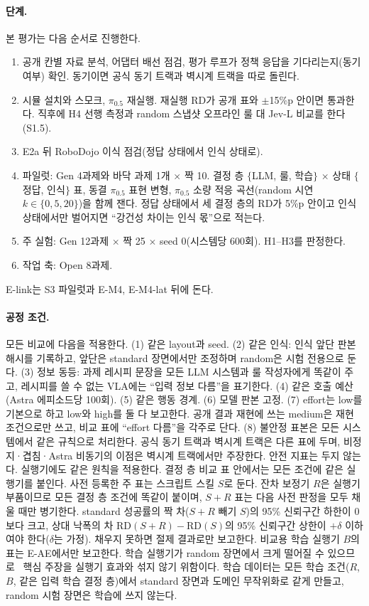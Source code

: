 \paragraph{단계.}
본 평가는 다음 순서로 진행한다.
\begin{enumerate}[label=S\arabic*.,start=0]
  \item 공개 칸별 자료 분석, 어댑터 배선 점검, 평가 루프가 정책 응답을 기다리는지(동기 여부) 확인. 동기이면 공식 동기 트랙과 벽시계 트랙을 따로 돌린다.
  \item 시뮬 설치와 스모크, $\pi_{0.5}$ 재실행. 재실행 RD가 공개 표와 $\pm$15\%p 안이면 통과한다. 직후에 H4 선행 측정과 random 스냅샷 오프라인 룰 대 Jev-L 비교를 한다(S1.5).
  \item E2a 뒤 RoboDojo 이식 점검(정답 상태에서 인식 상태로).
  \item 파일럿: Gen 4과제와 바닥 과제 1개 $\times$ 짝 10. 결정 층 $\{$LLM, 룰, 학습$\}$ $\times$ 상태 $\{$정답, 인식$\}$ 표, 동결 $\pi_{0.5}$ 표현 변형, $\pi_{0.5}$ 소량 적응 곡선(random 시연 $k\in\{0,5,20\}$)을 함께 잰다. 정답 상태에서 세 결정 층의 RD가 5\%p 안이고 인식 상태에서만 벌어지면 ``강건성 차이는 인식 몫''으로 적는다.
  \item 주 실험: Gen 12과제 $\times$ 짝 25 $\times$ seed 0(시스템당 600회). H1--H3를 판정한다.
  \item 작업 축: Open 8과제.
\end{enumerate}
E-link는 S3 파일럿과 E-M4, E-M4-lat 뒤에 돈다.

\paragraph{공정 조건.}
모든 비교에 다음을 적용한다. (1) 같은 layout과 seed. (2) 같은 인식: 인식 앞단 판본 해시를 기록하고, 앞단은 standard 장면에서만 조정하며 random은 시험 전용으로 둔다. (3) 정보 동등: 과제 레시피 문장을 모든 LLM 시스템과 룰 작성자에게 똑같이 주고, 레시피를 쓸 수 없는 VLA에는 ``입력 정보 다름''을 표기한다. (4) 같은 호출 예산(Astra 에피소드당 100회). (5) 같은 행동 경계. (6) 모델 판본 고정. (7) effort는 low를 기본으로 하고 low와 high를 둘 다 보고한다. 공개 결과 재현에 쓰는 medium은 재현 조건으로만 쓰고, 비교 표에 ``effort 다름''을 각주로 단다. (8) 불안정 표본은 모든 시스템에서 같은 규칙으로 처리한다. 공식 동기 트랙과 벽시계 트랙은 다른 표에 두며, 비정지·겹침·Astra 비동기의 이점은 벽시계 트랙에서만 주장한다. 안전 지표는 두지 않는다.
실행기에도 같은 원칙을 적용한다. 결정 층 비교 표 안에서는 모든 조건에 같은 실행기를 붙인다. 사전 등록한 주 표는 스크립트 스킬 $S$로 둔다. 잔차 보정기 $R$은 실행기 부품이므로 모든 결정 층 조건에 똑같이 붙이며, $S{+}R$ 표는 다음 사전 판정을 모두 채울 때만 병기한다. standard 성공률의 짝 차($S{+}R$ 빼기 $S$)의 95\% 신뢰구간 하한이 0보다 크고, 상대 낙폭의 차 $\mathrm{RD}(S{+}R)-\mathrm{RD}(S)$의 95\% 신뢰구간 상한이 $+\delta$ 이하여야 한다($\delta$는 가정). 채우지 못하면 절제 결과로만 보고한다. 비교용 학습 실행기 $B$의 표는 E-AE에서만 보고한다. 학습 실행기가 random 장면에서 크게 떨어질 수 있으므로~\cite{robotwin2_2025,liberoplus2025} 핵심 주장을 실행기 효과와 섞지 않기 위함이다. 학습 데이터는 모든 학습 조건($R$, $B$, 같은 입력 학습 결정 층)에서 standard 장면과 도메인 무작위화로 같게 만들고, random 시험 장면은 학습에 쓰지 않는다.

